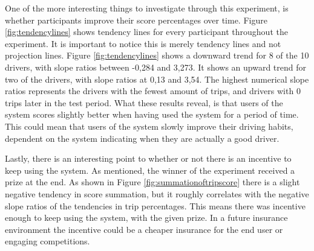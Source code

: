 One of the more interesting things to investigate through this experiment, is whether participants improve their score percentages over time. Figure \ref{fig:tendencylines} shows tendency lines for every participant throughout the experiment. It is important to notice this is merely tendency lines and not projection lines. Figure \ref{fig:tendencylines} shows a downward trend for 8 of the 10 drivers, with slope ratios between -0,284 and 3,273. It shows an upward trend for two of the drivers, with slope ratios at 0,13 and 3,54. The highest numerical slope ratios represents the drivers with the fewest amount of trips, and drivers with 0 trips later in the test period. What these results reveal, is that users of the system scores slightly better when having used the system for a period of time. This could mean that users of the system slowly improve their driving habits, dependent on the system indicating when they are actually a good driver.

Lastly, there is an interesting point to whether or not there is an incentive to keep using the system. As mentioned, the winner of the experiment received a prize at the end. As shown in Figure \ref{fig:summationoftripscore} there is a slight negative tendency in score summation, but it roughly correlates with the negative slope ratios of the tendencies in trip percentages. This means there was incentive enough to keep using the system, with the given prize. In a future insurance environment the incentive could be a cheaper insurance for the end user or engaging competitions.
 